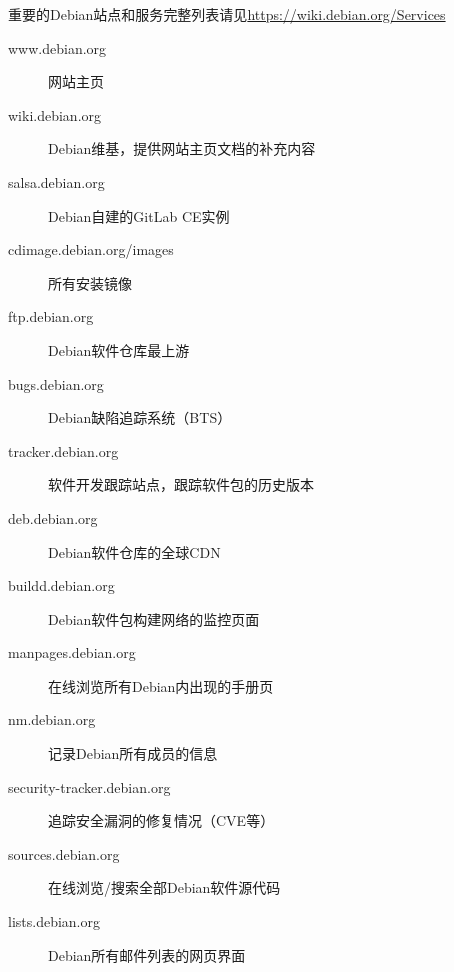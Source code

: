 
\begin{frame}{重要的Debian站点和服务}{完整列表请见\url{https://wiki.debian.org/Services}}
	\begin{description}
		\item[www.debian.org] 网站主页
		\item[wiki.debian.org] Debian维基，提供网站主页文档的补充内容
		\item[salsa.debian.org] Debian自建的GitLab CE实例
		\item[cdimage.debian.org/images] 所有安装镜像
		\item[ftp.debian.org] Debian软件仓库最上游
		\item[bugs.debian.org] Debian缺陷追踪系统（BTS）
		\item[tracker.debian.org] 软件开发跟踪站点，跟踪软件包的历史版本
		\item[deb.debian.org] Debian软件仓库的全球CDN
		\item[buildd.debian.org] Debian软件包构建网络的监控页面
		\item[manpages.debian.org] 在线浏览所有Debian内出现的手册页
		\item[nm.debian.org] 记录Debian所有成员的信息
		\item[security-tracker.debian.org] 追踪安全漏洞的修复情况（CVE等）
		\item[sources.debian.org] 在线浏览/搜索全部Debian软件源代码
		\item[lists.debian.org] Debian所有邮件列表的网页界面
	\end{description}
	
\end{frame}